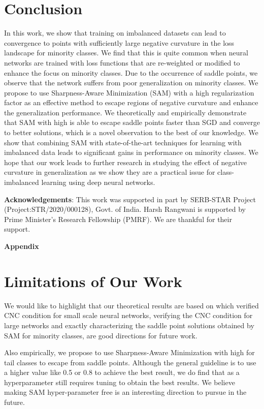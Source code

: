\documentclass{article}
\begin{document}
\section{Conclusion}
In this work, we show that training on imbalanced datasets can lead to convergence to points with sufficiently large negative curvature in the loss landscape for minority classes. We find that this is quite common when neural networks are trained with loss functions that are re-weighted or modified to enhance the focus on minority classes. Due to the occurrence of saddle points, we observe that the network suffers from poor generalization on minority classes. We propose to use Sharpness-Aware Minimization (SAM) with a high regularization factor  as an effective method to escape regions of negative curvature and enhance the generalization performance. We theoretically and empirically demonstrate that SAM with high  is able to escape saddle points faster than SGD and converge to better solutions, which is a novel observation to the best of our knowledge. We show that combining SAM with state-of-the-art techniques for learning with imbalanced data leads to significant gains in performance on minority classes. We hope that our work leads to further research in studying the effect of negative curvature in generalization as we show they are a practical issue for class-imbalanced learning using deep neural networks.


\textbf{Acknowledgements}: This work was supported in part by  SERB-STAR Project (Project:STR/2020/000128), Govt. of India. Harsh Rangwani is supported by Prime Minister's Research Fellowship (PMRF). We are thankful for their support.


\clearpage
\appendix

\textbf{\Large Appendix}

\section{Limitations of Our Work} 
We would like to highlight that our theoretical results are based on \citet{daneshmand2018escaping} which verified CNC condition for small scale neural networks, verifying the CNC condition for large networks and exactly characterizing the saddle point solutions obtained by SAM for minority classes, are good directions for future work. 

Also empirically, we propose to use Sharpness-Aware Minimization with high  for tail classes to escape from saddle points. Although the general guideline is to use a higher  value like 0.5 or 0.8 to achieve the best result, we do find that  as a hyperparameter still requires tuning to obtain the best results. We believe making SAM hyper-parameter free is an interesting direction to pursue in the future.
\end{document}
